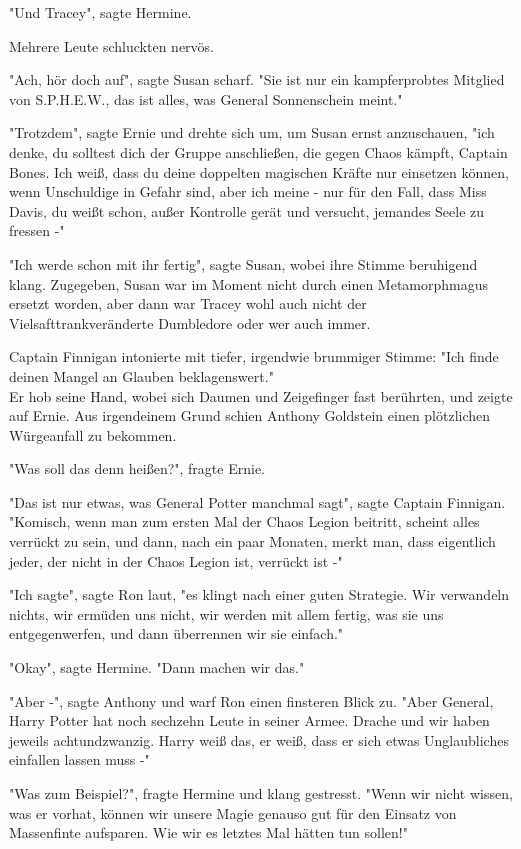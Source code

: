 {"Und Tracey", sagte Hermine.

Mehrere Leute schluckten nervös.

"Ach, hör doch auf", sagte Susan scharf. "Sie ist nur ein kampferprobtes Mitglied von S.P.H.E.W., das ist alles, was General Sonnenschein meint."

"Trotzdem", sagte Ernie und drehte sich um, um Susan ernst anzuschauen, "ich denke, du solltest dich der Gruppe anschließen, die gegen Chaos kämpft, Captain Bones. Ich weiß, dass du deine doppelten magischen Kräfte nur einsetzen können, wenn Unschuldige in Gefahr sind, aber ich meine - nur für den Fall, dass Miss Davis, du weißt schon, außer Kontrolle gerät und versucht, jemandes Seele zu fressen -"

"Ich werde schon mit ihr fertig", sagte Susan, wobei ihre Stimme beruhigend klang. Zugegeben, Susan war im Moment nicht durch einen Metamorphmagus ersetzt worden, aber dann war Tracey wohl auch nicht der Vielsafttrankveränderte Dumbledore oder wer auch immer.

Captain Finnigan intonierte mit tiefer, irgendwie brummiger Stimme: "Ich finde deinen Mangel an Glauben beklagenswert."\\ Er hob seine Hand, wobei sich Daumen und Zeigefinger fast berührten, und zeigte auf Ernie. Aus irgendeinem Grund schien Anthony Goldstein einen plötzlichen Würgeanfall zu bekommen.

"Was soll das denn heißen?", fragte Ernie.

"Das ist nur etwas, was General Potter manchmal sagt", sagte Captain Finnigan. "Komisch, wenn man zum ersten Mal der Chaos Legion beitritt, scheint alles verrückt zu sein, und dann, nach ein paar Monaten, merkt man, dass eigentlich jeder, der nicht in der Chaos Legion ist, verrückt ist -"

"Ich sagte", sagte Ron laut, "es klingt nach einer guten Strategie. Wir verwandeln nichts, wir ermüden uns nicht, wir werden mit allem fertig, was sie uns entgegenwerfen, und dann überrennen wir sie einfach."

"Okay", sagte Hermine. "Dann machen wir das."

"Aber -", sagte Anthony und warf Ron einen finsteren Blick zu. "Aber General, Harry Potter hat noch sechzehn Leute in seiner Armee. Drache und wir haben jeweils achtundzwanzig. Harry weiß das, er weiß, dass er sich etwas Unglaubliches einfallen lassen muss -"

"Was zum Beispiel?", fragte Hermine und klang gestresst. "Wenn wir nicht wissen, was er vorhat, können wir unsere Magie genauso gut für den Einsatz von Massenfinte aufsparen. Wie wir es letztes Mal hätten tun sollen!"

}
